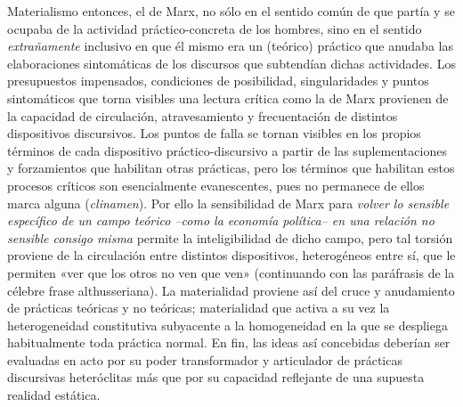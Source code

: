 Materialismo entonces, el de Marx, no sólo en el sentido común de que partía y se ocupaba de la actividad práctico-concreta de los hombres, sino en el sentido \emph{extrañamente} inclusivo en que él mismo era un (teórico) práctico que anudaba las elaboraciones sintomáticas de los discursos que subtendían dichas actividades. Los presupuestos impensados, condiciones de posibilidad, singularidades y puntos sintomáticos que torna visibles una lectura crítica como la de Marx provienen de la capacidad de circulación, atravesamiento y frecuentación de distintos dispositivos discursivos. Los puntos de falla se tornan visibles en los propios términos de cada dispositivo práctico-discursivo a partir de las suplementaciones y forzamientos que habilitan otras prácticas, pero los términos que habilitan estos procesos críticos son esencialmente evanescentes, pues no permanece de ellos marca alguna (\emph{clinamen}). Por ello la sensibilidad de Marx para \emph{volver lo sensible específico de un campo teórico --como la economía política-- en una relación no sensible consigo misma} permite la inteligibilidad de dicho campo, pero tal torsión proviene de la circulación entre distintos dispositivos, heterogéneos entre sí, que le permiten «ver que los otros no ven que ven» (continuando con las paráfrasis de la célebre frase althusseriana). La materialidad proviene así del cruce y anudamiento de prácticas teóricas y no teóricas; materialidad que activa a su vez la heterogeneidad constitutiva subyacente a la homogeneidad en la que se despliega habitualmente toda práctica normal. En fin, las ideas así concebidas deberían ser evaluadas en acto por su poder transformador y articulador de prácticas discursivas heteróclitas más que por su capacidad reflejante de una supuesta realidad estática.

